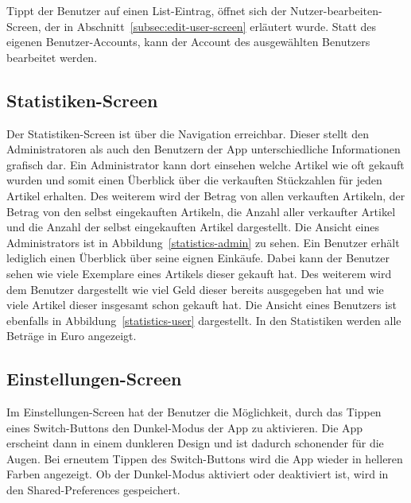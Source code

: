 Tippt der Benutzer auf einen List-Eintrag, öffnet sich der Nutzer-bearbeiten-Screen, der in Abschnitt~\ref{subsec:edit-user-screen} erläutert wurde.
Statt des eigenen Benutzer-Accounts, kann der Account des ausgewählten Benutzers bearbeitet werden.

\subsection{Statistiken-Screen} \label{subsec:statistics-screen}

Der Statistiken-Screen ist über die Navigation erreichbar.
Dieser stellt den Administratoren als auch den Benutzern der App unterschiedliche Informationen grafisch dar.
Ein Administrator kann dort einsehen welche Artikel wie oft gekauft wurden und somit einen Überblick über die verkauften Stückzahlen für jeden Artikel erhalten.
Des weiterem wird der Betrag von allen verkauften Artikeln, der Betrag von den selbst eingekauften Artikeln, die Anzahl aller verkaufter Artikel und die Anzahl der selbst eingekauften Artikel dargestellt.
Die Ansicht eines Administrators ist in Abbildung~\ref{statistics-admin} zu sehen.
Ein Benutzer erhält lediglich einen Überblick über seine eignen Einkäufe.
Dabei kann der Benutzer sehen wie viele Exemplare eines Artikels dieser gekauft hat.
Des weiterem wird dem Benutzer dargestellt wie viel Geld dieser bereits ausgegeben hat und wie viele Artikel dieser insgesamt schon gekauft hat.
Die Ansicht eines Benutzers ist ebenfalls in Abbildung~\ref{statistics-user} dargestellt.
In den Statistiken werden alle Beträge in Euro angezeigt.


\subsection{Einstellungen-Screen} \label{subsec:settings-screen}

Im Einstellungen-Screen hat der Benutzer die Möglichkeit, durch das Tippen eines Switch-Buttons den Dunkel-Modus der App zu aktivieren.
Die App erscheint dann in einem dunkleren Design und ist dadurch schonender für die Augen.
Bei erneutem Tippen des Switch-Buttons wird die App wieder in helleren Farben angezeigt.
Ob der Dunkel-Modus aktiviert oder deaktiviert ist, wird in den Shared-Preferences gespeichert.

